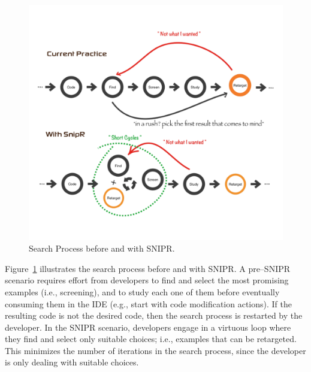 \begin{figure}[!ht]
    \centering
    \includegraphics[width=\textwidth]{images/searchprocess}
    \caption{Search Process before and with \uppercase{SnipR}.}
    \label{fig:retargeting}
\end{figure}

Figure~\ref{fig:retargeting} illustrates the search process before and with \uppercase{SnipR}. A pre--\uppercase{SnipR} scenario requires effort from developers to find and select the most promising examples (i.e., screening), and to study each one of them before eventually consuming them in the IDE (e.g., start with code modification actions). If the resulting code is not the desired code, then the search process is restarted by the developer. In the \uppercase{SnipR} scenario, developers engage in a virtuous loop where they find and select only suitable choices; i.e., examples that can be retargeted. This minimizes the number of iterations in the search process, since the developer is only dealing with suitable choices.

